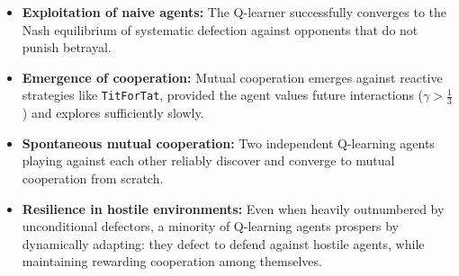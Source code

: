 \documentclass[11pt, a4paper]{article}
\begin{document}
\begin{itemize}
    \item \textbf{Exploitation of naive agents:} The Q-learner successfully converges to the Nash equilibrium of systematic defection against opponents that do not punish betrayal.
    \item \textbf{Emergence of cooperation:} Mutual cooperation emerges against reactive strategies like \texttt{TitForTat}, provided the agent values future interactions ($\gamma > \frac{1}{3}$) and explores sufficiently slowly.
    \item \textbf{Spontaneous mutual cooperation:} Two independent Q-learning agents playing against each other reliably discover and converge to mutual cooperation from scratch.
    \item \textbf{Resilience in hostile environments:} Even when heavily outnumbered by unconditional defectors, a minority of Q-learning agents prospers by dynamically adapting: they defect to defend against hostile agents, while maintaining rewarding cooperation among themselves.
\end{itemize}


\newpage

\end{document}
